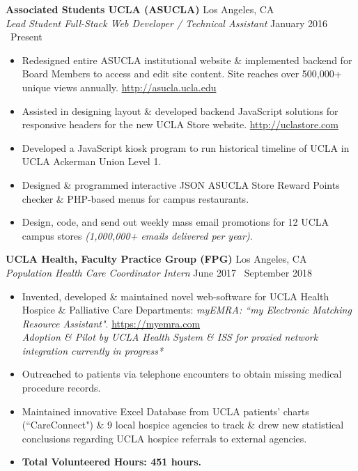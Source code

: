 \documentclass[margin]{res}
\begin{document}
\begin{resume}
		{\bf Associated Students UCLA (ASUCLA)} \hfill Los Angeles, CA \\
		{\it Lead Student Full-Stack Web Developer / Technical Assistant} \hfill January 2016 \textendash\ Present
		\begin{itemize} \itemsep -2pt
			\item Redesigned entire ASUCLA institutional website \& implemented backend for Board Members to access and edit site content. Site reaches over 500,000+ unique views annually. \textcolor{RoyalBlue}{\url{http://asucla.ucla.edu}}
			\item Assisted in designing layout \& developed backend JavaScript solutions for responsive headers for the new UCLA Store website. \textcolor{RoyalBlue}{\url{http://uclastore.com}}
			\item Developed a JavaScript kiosk program to run historical timeline of UCLA in UCLA Ackerman Union Level 1.
			\item Designed \& programmed interactive JSON ASUCLA Store Reward Points checker \& PHP-based menus for campus restaurants.
			\item Design, code, and send out weekly mass email promotions for 12 UCLA campus stores {\it (1,000,000+ emails delivered per year)}.
		\end{itemize}
		
		{\bf UCLA Health, Faculty Practice Group (FPG)} \hfill Los Angeles, CA \\
		{\it Population Health Care Coordinator Intern} \hfill June 2017 \textendash\ September 2018
		\begin{itemize} \itemsep -2pt
			\item Invented, developed \& maintained novel web-software for UCLA Health Hospice \& Palliative Care Departments: {\it myEMRA\textsuperscript{\textregistered}: ``my Electronic Matching Resource Assistant"}. \textcolor{RoyalBlue}{\url{https://myemra.com}} \\ {\sl *Adoption \& Pilot by UCLA Health System \& ISS for proxied network integration currently in progress*}
			\item Outreached to patients via telephone encounters to obtain missing medical procedure records.
			\item Maintained innovative Excel Database from UCLA patients' charts (``CareConnect") \& 9 local hospice agencies to track \& drew new statistical conclusions regarding UCLA hospice referrals to external agencies.
			\item {\bf Total Volunteered Hours: 451 hours.}
		\end{itemize}
		

\end{resume}
\end{document}
